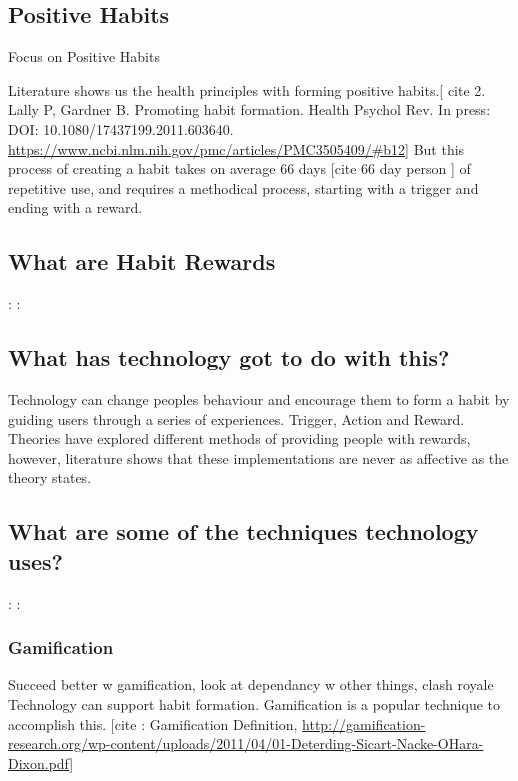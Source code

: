 {\subsection*{Positive Habits}

Focus on Positive Habits

Literature shows us the health principles with forming positive habits.[ cite 2. Lally P, Gardner B. Promoting habit formation. Health Psychol Rev. In press: DOI: 10.1080/17437199.2011.603640. \url{https://www.ncbi.nlm.nih.gov/pmc/articles/PMC3505409/#b12}] But this process of creating a habit takes on average 66 days [cite 66 day person ] of repetitive use, and requires a methodical process, starting with a trigger and ending with a reward.

\subsection*{What are Habit Rewards}

:\newline
:

\subsection*{What has technology got to do with this?}

Technology can change peoples behaviour and encourage them to form a habit by guiding users through a series of experiences. Trigger, Action and Reward. Theories have explored different methods of providing people with rewards, however, literature shows that these implementations are never as affective as the theory states.

\subsection*{What are some of the techniques technology uses?}

:\newline
:

\subsubsection*{Gamification}
Succeed better w gamification, look at dependancy w other things, clash royale
Technology can support habit formation. Gamification is a popular technique to accomplish this. [cite : Gamification Definition, \url{http://gamification-research.org/wp-content/uploads/2011/04/01-Deterding-Sicart-Nacke-OHara-Dixon.pdf}]

}
